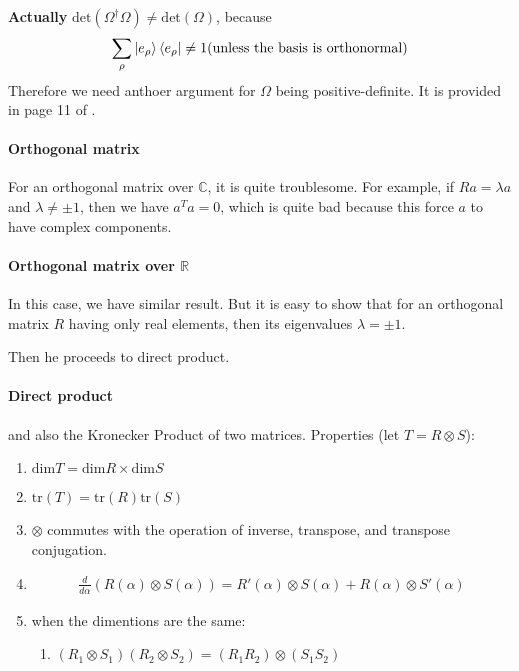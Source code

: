 \textbf{Actually} 
$\text{det}(\Omega^\dagger \Omega)\neq\text{det}(\Omega)$, because
\begin{align}
    \sum_\rho \ket{e_\rho}\bra{e_\rho} \neq 1 \text{(unless the basis is
        orthonormal)}
\end{align}
Therefore we need anthoer argument for $\Omega$ being positive-definite.
It is provided in page 11 of \cite{book}.

\paragraph{Orthogonal matrix} For an orthogonal matrix over $\mathbb{C}$,
it is quite troublesome. For example, if $Ra=\lambda a$ and
$\lambda \neq \pm 1$, then we have $a^T a=0$, which is quite bad because
this force $a$ to have complex components.

\paragraph{Orthogonal matrix over $\mathbb{R}$} In this case, we have
similar result. But it is easy to show that for an orthogonal matrix
$R$ having only real elements, then its eigenvalues $\lambda= \pm 1$.

Then he proceeds to direct product.
\paragraph{Direct product} and also the Kronecker Product of two
matrices. Properties (let $T=R\otimes S$):
\begin{enumerate}
    \item $\mathrm{dim}T = \mathrm{dim}R \times \mathrm{dim}S$
    \item $\mathrm{tr}(T)=\mathrm{tr}(R)\mathrm{tr}(S)$
    \item $\otimes$ commutes with the operation of inverse, transpose,
        and transpose conjugation.
    \item \begin{align}
            \frac{d}{d\alpha} (R(\alpha)\otimes S(\alpha)) =
            R'(\alpha)\otimes S(\alpha) + R(\alpha)\otimes S'(\alpha)
    \end{align}
    \item when the dimentions are the same:
        \begin{enumerate}
            \item 
            $(R_1\otimes S_1)(R_2\otimes S_2) = (R_1R_2)\otimes (S_1S_2)$
        \end{enumerate}
\end{enumerate}

